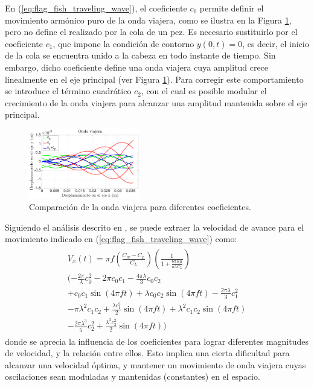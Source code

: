 En (\ref{eq:flag_fish_traveling_wave}), el coeficiente $c_0$ permite definir el movimiento armónico puro de la onda viajera, como se ilustra en la Figura \ref{fig:FC}, pero no define el realizado por la cola de un pez. Es necesario sustituirlo por el coeficiente $c_1$, que impone la condición de contorno $y(0,t) = 0$, es decir, el inicio de la cola se encuentra unido a la cabeza en todo instante de tiempo. Sin embargo, dicho coeficiente define una onda viajera cuya amplitud crece linealmente en el eje principal (ver Figura \ref{fig:FC}). Para corregir este comportamiento se introduce el término cuadrático $c_2$, con el cual es posible modular el crecimiento de la onda viajera para alcanzar una amplitud mantenida sobre el eje principal.
\begin{figure}[!h] %
	\vspace*{3mm}
    \centering
    \includegraphics[width=0.43\textwidth]{Figuras/FC}
  	\caption{Comparación de la onda viajera para diferentes coeficientes.}
  	\label{fig:FC}
\end{figure}

Siguiendo el análisis descrito en \cite{Gray1955}, se puede extraer la velocidad de avance para el movimiento indicado en (\ref{eq:flag_fish_traveling_wave}) como:
\begin{eqnarray}
\label{eq:Vx_fish}
\begin{split}
	V_x (t)  =  \pi f\left( \frac{C_N - C_L}{C_L} \right) \left( \frac{1}{ 1 + \frac{6 \pi R \mu}{n \lambda C_L} }  \right)\\
(- \frac{2 \pi}{\lambda} c_0^2 - 2 \pi c_0 c_1 - \frac{4 \pi \lambda}{3} c_0 c_2 \\ 
+ c_0 c_1 \sin \left( 4 \pi f t \right) + \lambda c_0 c_2 \sin \left( 4 \pi f t \right) - \frac{2 \pi \lambda}{3} c_1^2 \\
- \pi \lambda^2 c_1 c_2 + \frac{\lambda c_1^2}{2} \sin \left( 4 \pi f t \right) + \lambda^2 c_1 c_2 \sin \left( 4 \pi f t \right) \\
- \frac{2 \pi \lambda^3}{5} c_2^2 + \frac{\lambda^3 c_2^2}{2} \sin \left( 4 \pi f t \right) )
	 		\end{split}
\end{eqnarray}
donde se aprecia la influencia de los coeficientes para lograr diferentes magnitudes de velocidad, y la relación entre ellos. Esto implica una cierta dificultad para alcanzar una velocidad óptima, y mantener un movimiento de onda viajera cuyas oscilaciones sean moduladas y mantenidas (constantes) en el espacio.\\

